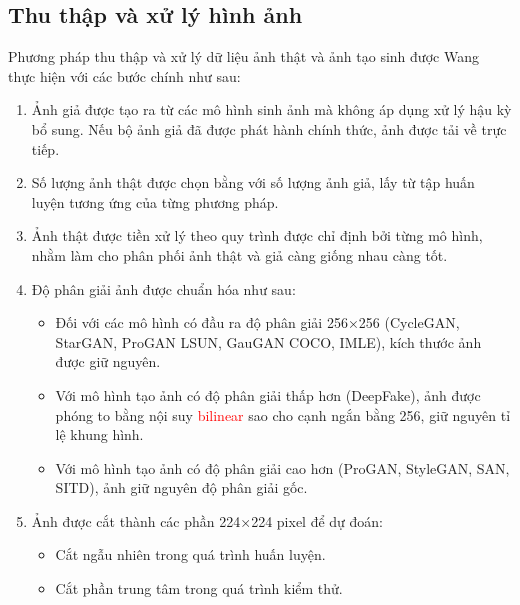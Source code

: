 \subsection{Thu thập và xử lý hình ảnh}
\label{ssec:thu_thap_va_xu_ly_hinh_anh}
%
Phương pháp thu thập và xử lý dữ liệu ảnh thật và ảnh tạo sinh được Wang~\cite{Wang2019CNNGeneratedIA} thực hiện với các bước chính như sau:
%
%
\begin{enumerate}
	\item Ảnh giả được tạo ra từ các mô hình sinh ảnh mà không áp dụng xử lý hậu kỳ bổ sung. Nếu bộ ảnh giả đã được phát hành chính thức, ảnh được tải về trực tiếp.
	
	\item Số lượng ảnh thật được chọn bằng với số lượng ảnh giả, lấy từ tập huấn luyện tương ứng của từng phương pháp.
	
	\item Ảnh thật được tiền xử lý theo quy trình được chỉ định bởi từng mô hình, nhằm làm cho phân phối ảnh thật và giả càng giống nhau càng tốt.
	
	\item Độ phân giải ảnh được chuẩn hóa như sau:
	\begin{itemize}
		\item Đối với các mô hình có đầu ra độ phân giải 256×256 (CycleGAN, StarGAN, ProGAN LSUN, GauGAN COCO, IMLE), kích thước ảnh được giữ nguyên.
		\item Với mô hình tạo ảnh có độ phân giải thấp hơn (DeepFake), ảnh được phóng to bằng nội suy \textcolor{red}{bilinear} sao cho cạnh ngắn bằng 256, giữ nguyên tỉ lệ khung hình.
		\item Với mô hình tạo ảnh có độ phân giải cao hơn (ProGAN, StyleGAN, SAN, SITD), ảnh giữ nguyên độ phân giải gốc.
	\end{itemize}
	
	\item Ảnh được cắt thành các phần 224×224 pixel để dự đoán:
	\begin{itemize}
		\item Cắt ngẫu nhiên trong quá trình huấn luyện.
		\item Cắt phần trung tâm trong quá trình kiểm thử.
	\end{itemize}
	
\end{enumerate}
%
%

